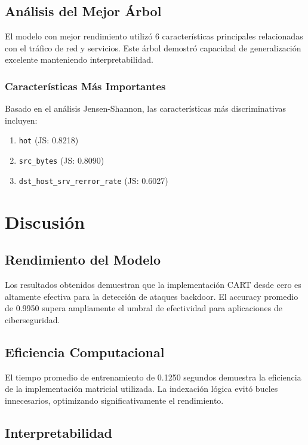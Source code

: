 \documentclass[12pt,a4paper]{article}
\begin{document}
\subsection{Análisis del Mejor Árbol}

El modelo con mejor rendimiento utilizó 6 características principales relacionadas con el tráfico de red y servicios. Este árbol demostró capacidad de generalización excelente manteniendo interpretabilidad.

\subsubsection{Características Más Importantes}

Basado en el análisis Jensen-Shannon, las características más discriminativas incluyen:
\begin{enumerate}
    \item \texttt{hot} (JS: 0.8218)
    \item \texttt{src_bytes} (JS: 0.8090)
    \item \texttt{dst_host_srv_rerror_rate} (JS: 0.6027)
\end{enumerate}

\section{Discusión}

\subsection{Rendimiento del Modelo}

Los resultados obtenidos demuestran que la implementación CART desde cero es altamente efectiva para la detección de ataques backdoor. El accuracy promedio de 0.9950 supera ampliamente el umbral de efectividad para aplicaciones de ciberseguridad.

\subsection{Eficiencia Computacional}

El tiempo promedio de entrenamiento de 0.1250 segundos demuestra la eficiencia de la implementación matricial utilizada. La indexación lógica evitó bucles innecesarios, optimizando significativamente el rendimiento.

\subsection{Interpretabilidad}
\end{document}

